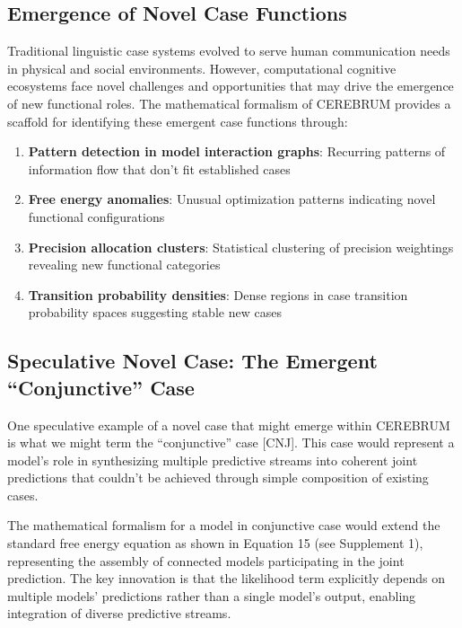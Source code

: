 \documentclass[
  11pt,
  letterpaper,
]{article}
\providecommand{\tightlist}{%
  \setlength{\itemsep}{0pt}\setlength{\parskip}{0pt}}
\begin{document}
\hypertarget{emergence-of-novel-case-functions}{%
\subsection{Emergence of Novel Case
Functions}\label{emergence-of-novel-case-functions}}

Traditional linguistic case systems evolved to serve human communication
needs in physical and social environments. However, computational
cognitive ecosystems face novel challenges and opportunities that may
drive the emergence of new functional roles. The mathematical formalism
of CEREBRUM provides a scaffold for identifying these emergent case
functions through:

\begin{enumerate}
\def\labelenumi{\arabic{enumi}.}
\tightlist
\item
  \textbf{Pattern detection in model interaction graphs}: Recurring
  patterns of information flow that don't fit established cases
\item
  \textbf{Free energy anomalies}: Unusual optimization patterns
  indicating novel functional configurations
\item
  \textbf{Precision allocation clusters}: Statistical clustering of
  precision weightings revealing new functional categories
\item
  \textbf{Transition probability densities}: Dense regions in case
  transition probability spaces suggesting stable new cases
\end{enumerate}

\hypertarget{speculative-novel-case-the-emergent-conjunctive-case}{%
\subsection{Speculative Novel Case: The Emergent ``Conjunctive''
Case}\label{speculative-novel-case-the-emergent-conjunctive-case}}

One speculative example of a novel case that might emerge within
CEREBRUM is what we might term the ``conjunctive'' case {[}CNJ{]}. This
case would represent a model's role in synthesizing multiple predictive
streams into coherent joint predictions that couldn't be achieved
through simple composition of existing cases.

The mathematical formalism for a model in conjunctive case would extend
the standard free energy equation as shown in Equation 15 (see
Supplement 1), representing the assembly of connected models
participating in the joint prediction. The key innovation is that the
likelihood term explicitly depends on multiple models' predictions
rather than a single model's output, enabling integration of diverse
predictive streams.
\end{document}
